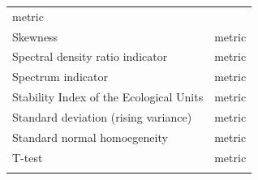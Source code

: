 \documentclass[12pt,twoside,openany]{reedthesis}
\begin{document}
\begin{longtable}[]{@{}lc@{}}
\begin{minipage}[t]{0.35\columnwidth}
metric\strut
\end{minipage}\tabularnewline
\begin{minipage}[t]{0.43\columnwidth}\raggedright
Skewness\strut
\end{minipage} & \begin{minipage}[t]{0.35\columnwidth}\centering
metric\strut
\end{minipage}\tabularnewline
\begin{minipage}[t]{0.43\columnwidth}\raggedright
Spectral density ratio
indicator\strut
\end{minipage} & \begin{minipage}[t]{0.35\columnwidth}\centering
metric\strut
\end{minipage}\tabularnewline
\begin{minipage}[t]{0.43\columnwidth}\raggedright
Spectrum indicator\strut
\end{minipage} & \begin{minipage}[t]{0.35\columnwidth}\centering
metric\strut
\end{minipage}\tabularnewline
\begin{minipage}[t]{0.43\columnwidth}\raggedright
Stability Index of the
Ecological Units\strut
\end{minipage} & \begin{minipage}[t]{0.35\columnwidth}\centering
metric\strut
\end{minipage}\tabularnewline
\begin{minipage}[t]{0.43\columnwidth}\raggedright
Standard deviation (rising
variance)\strut
\end{minipage} & \begin{minipage}[t]{0.35\columnwidth}\centering
metric\strut
\end{minipage}\tabularnewline
\begin{minipage}[t]{0.43\columnwidth}\raggedright
Standard normal homoegeneity\strut
\end{minipage} & \begin{minipage}[t]{0.35\columnwidth}\centering
metric\strut
\end{minipage}\tabularnewline
\begin{minipage}[t]{0.43\columnwidth}\raggedright
T-test\strut
\end{minipage} & \begin{minipage}[t]{0.35\columnwidth}\centering
metric\strut
\end{minipage}\tabularnewline
\begin{minipage}[t]{0.43\columnwidth}\raggedright

\end{minipage}
\end{longtable}
\end{document}
